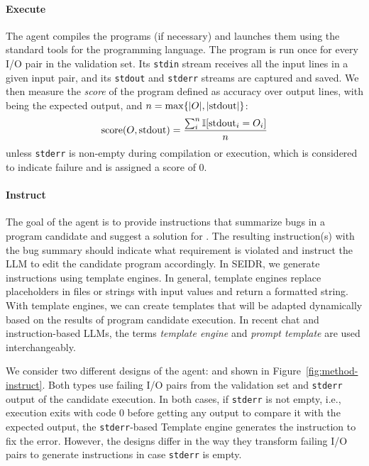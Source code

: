 \paragraph{Execute}
\label{sec:seidr-execute}

The \execute{} agent compiles the programs (if necessary) and launches them using the standard tools for the programming language.
The program is run once for every I/O pair in the validation set. 
Its \texttt{stdin} stream receives all the input lines in a given input pair, and its \texttt{stdout} and \texttt{stderr} streams are captured and saved.
We then measure the \emph{score} of the program defined as accuracy over output lines, with \expectedoutput{} being the expected output, and $n=\max\{|O{}|, |\text{stdout}|\}$:
\[    
\text{score}(O{}, \text{stdout}) = \frac{\sum^{n}_i{\mathbb{I}[\text{stdout}_i = O_i]}}{n} 
\]
unless \texttt{stderr} is non-empty during compilation or execution, which is considered to indicate failure and is assigned a score of 0.

\paragraph{Instruct}
\label{sec:seidr-instruct}

The goal of the \instruct{} agent is to provide instructions that summarize bugs in a program candidate and suggest a solution for \debugmodel{}. 
The resulting instruction(s) with the bug summary should indicate what requirement is violated and instruct the LLM to edit the candidate program accordingly. 
In SEIDR, we generate instructions using template engines. 
In general, template engines replace placeholders in files or strings with input values and return a formatted string. 
With template engines, we can create templates that will be adapted dynamically based on the results of program candidate execution. 
In recent chat and instruction-based LLMs, the terms \emph{template engine} and \emph{prompt template} are used interchangeably.

We consider two different designs of the \instruct{} agent: \instructs{} and \instructllm{} shown in Figure~\ref{fig:method-instruct}. 
Both types use failing I/O pairs from the validation set and \texttt{stderr} output of the candidate execution. 
In both cases, if \texttt{stderr} is not empty, i.e., execution exits with code 0 before getting any output to compare it with the expected output, the \texttt{stderr}-based Template engine generates the instruction to fix the error. 
However, the designs differ in the way they transform failing I/O pairs to generate instructions in case \texttt{stderr} is empty.

